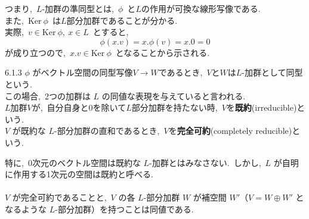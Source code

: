 \documentclass[uplatex,dvipdfmx]{jsarticle}
\begin{document}
つまり,~$L$-加群の準同型とは,~$\phi$~と$L$の作用が可換な線形写像である.\\
また,~$\text{Ker}~\phi$~は$L$部分加群であることが分かる.\\
実際,~$v\in \text{Ker}~\phi,~x\in L$~とすると,
\begin{equation*}
    \phi(x.v)=x.\phi(v)=x.0=0
\end{equation*}
が成り立つので,~$x.v\in \text{Ker}~\phi$~となることから示される.\\
\begin{mydef}{6.1.3}
    $\phi$ がベクトル空間の同型写像$V\to W$であるとき,~$V $と$W$は$L$-加群として同型という.\\
    この場合,~2つの加群は $L$ の同値な表現を与えていると言われる.\\
    $L$加群$V$が,~自分自身と0を除いて$L$部分加群を持たない時,~$V$を\textbf{既約}(irreducible)という.\\
    $V$ が既約な $L$-部分加群の直和であるとき,~$V$を\textbf{完全可約}(completely reducible)という.
\end{mydef}
特に,~0次元のベクトル空間は既約な $L$-加群とはみなさない.~しかし,~$L$ が自明に作用する1次元の空間は既約と呼べる.\\
\\
$V$ が完全可約であることと,~$V$ の各 $L$-部分加群 $W$ が補空間 $W'$（$V = W \oplus W'$ となるような $L$-部分加群）を持つことは同値である.
\end{document}
